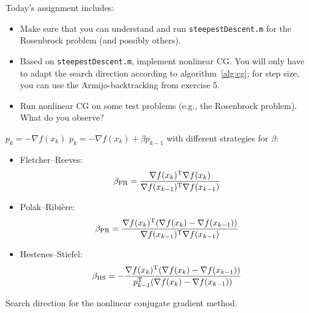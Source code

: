 Today's assignment includes:
\begin{itemize}
    \item Make sure that you can understand and run \texttt{steepestDescent.m}
      for the Rosenbrock problem (and possibly others).
    \item Based on \texttt{steepestDescent.m}, implement nonlinear CG. You
      will only have to adapt the search direction according to
      algorithm~\ref{alg:cg}; for step size, you can use the
      Armijo-backtracking from exercise 5.
    \item Run nonlinear CG on some test problems (e.g., the Rosenbrock
      problem). What do you observe?
\end{itemize}

\begin{algorithm}
  \begin{algorithmic}[1]
      \State $p_k = -\nabla f(x_k)$
    \Else
      \State $p_k = -\nabla f(x_k) + \beta p_{k-1}$
  with different strategies for $\beta$:
  \begin{itemize}
    \item Fletcher--Reeves:
      \[
        \beta_{\text{FR}}=\frac{\nabla f(x_k)^{\text{\upshape T}} \nabla f(x_k)}{\nabla f(x_{k-1})^{\text{\upshape T}} \nabla f(x_{k-1})}
        \]
       \item Polak--Ribi\`ere:
         \[
           \beta_{\text{PR}}=\frac{\nabla f(x_k)^{\text{\upshape T}} (\nabla f(x_k)-\nabla f(x_{k-1}))}{\nabla f(x_{k-1})^{\text{\upshape T}} \nabla f(x_{k-1})}
      \]
       \item Hestenes--Stiefel:
         \[
           \beta_{\text{HS}}=-\frac{\nabla f(x_k)^{\text{\upshape T}} (\nabla f(x_k)-\nabla f(x_{k-1}))}{p_{k-1}^{\text{\upshape T}} (\nabla f(x_{k}) - \nabla f(x_{k-1}))}
      \]
  \end{itemize}
    \EndIf
  \end{algorithmic}
  \caption{Search direction for the nonlinear conjugate gradient method.}
  \label{alg:cg}
\end{algorithm}






